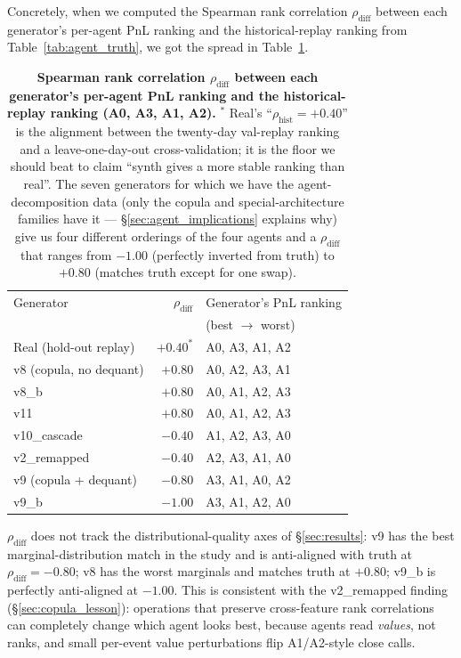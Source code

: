 \documentclass[journal]{IEEEtran}
\newcommand{\rdiff}{\rho_{\text{diff}}}
\theoremstyle{definition}   %
\begin{document}
Concretely, when we computed the Spearman rank correlation $\rdiff$
between each generator's per-agent PnL ranking and the
historical-replay ranking from Table~\ref{tab:agent_truth}, we got
the spread in Table~\ref{tab:rho_diff_spread}.

\begin{table}[ht]
    \centering
    \footnotesize
    \begin{tabular}{lrl}
        \toprule
        Generator & $\rdiff$ & Generator's PnL ranking \\
        & & (best $\to$ worst) \\
        \midrule
        Real (hold-out replay)        & $+0.40^{*}$ & A0, A3, A1, A2 \\
        \midrule
        v8 (copula, no dequant)       & $+0.80$ & A0, A2, A3, A1 \\
        v8\_b                         & $+0.80$ & A0, A1, A2, A3 \\
        v11                           & $+0.80$ & A0, A1, A2, A3 \\
        v10\_cascade                  & $-0.40$ & A1, A2, A3, A0 \\
        v2\_remapped                  & $-0.40$ & A2, A3, A1, A0 \\
        v9 (copula + dequant)         & $-0.80$ & A3, A1, A0, A2 \\
        v9\_b                         & $-1.00$ & A3, A1, A2, A0 \\
        \bottomrule
    \end{tabular}
    \caption{\textbf{Spearman rank correlation $\rdiff$ between each
    generator's per-agent PnL ranking and the historical-replay
    ranking (A0, A3, A1, A2).} ${}^{*}$ Real's
    ``$\rho_\text{hist} = +0.40$'' is the alignment between the
    twenty-day val-replay ranking and a leave-one-day-out
    cross-validation; it is the floor we should beat to claim
    ``synth gives a more stable ranking than real''. The seven
    generators for which we have the agent-decomposition data
    (only the copula and special-architecture families have it ---
    \S\ref{sec:agent_implications} explains why) give us four
    different orderings of the four agents and a $\rdiff$ that ranges
    from $-1.00$ (perfectly inverted from truth) to $+0.80$ (matches
    truth except for one swap).}
    \label{tab:rho_diff_spread}
\end{table}

$\rdiff$ does not track the distributional-quality axes of
\S\ref{sec:results}: v9 has the best marginal-distribution match
in the study and is anti-aligned with truth at $\rdiff = -0.80$;
v8 has the worst marginals and matches truth at $+0.80$; v9\_b is
perfectly anti-aligned at $-1.00$. This is consistent with the
v2\_remapped finding (\S\ref{sec:copula_lesson}): operations that
preserve cross-feature rank correlations can completely change
which agent looks best, because agents read \emph{values}, not
ranks, and small per-event value perturbations flip A1/A2-style
close calls.
\end{document}
